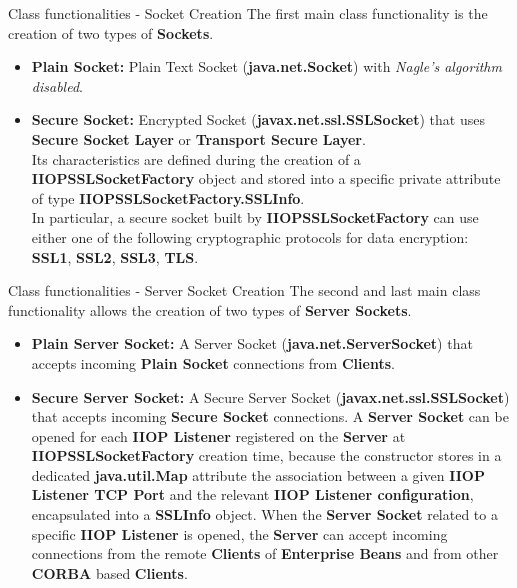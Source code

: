 \documentclass{../common/latex_classes/pdf_presentation}
\begin{document}
		\begin{frame}{Class functionalities - Socket Creation}
			The first main class functionality is the creation of two types of \textbf{Sockets}.
			\begin{itemize}
				\item \textbf{Plain Socket:}
					Plain Text Socket (\textbf{java.net.Socket}) with \textit{Nagle's algorithm disabled}.
				\item \textbf{Secure Socket:}
					Encrypted Socket (\textbf{javax.net.ssl.SSLSocket}) that uses \textbf{Secure Socket Layer} or \textbf{Transport Secure Layer}.\\
					Its characteristics are defined during the creation of a \textbf{IIOPSSLSocketFactory} object and stored into a specific private attribute of type \textbf{IIOPSSLSocketFactory.SSLInfo}.\\
					In particular, a secure socket built by \textbf{IIOPSSLSocketFactory} can use either one of the following cryptographic protocols for data encryption: \textbf{SSL1}, \textbf{SSL2}, \textbf{SSL3}, \textbf{TLS}.
			\end{itemize}
		\end{frame}
		
		\begin{frame}{Class functionalities - Server Socket Creation}
			The second and last main class functionality allows the creation of two types of \textbf{Server Sockets}.
			\begin{itemize}
				\item \textbf{Plain Server Socket:}
					A Server Socket (\textbf{java.net.ServerSocket}) that accepts incoming \textbf{Plain Socket} connections from \textbf{Clients}.
				\item \textbf{Secure Server Socket:}
					A Secure Server Socket (\textbf{javax.net.ssl.SSLSocket}) that accepts incoming \textbf{Secure Socket} connections.
					A \textbf{Server Socket} can be opened for each \textbf{IIOP Listener} registered on the \textbf{Server} at \textbf{IIOPSSLSocketFactory} creation time, because the constructor stores in a dedicated \textbf{java.util.Map} attribute the association between a given \textbf{IIOP Listener TCP Port} and the relevant \textbf{IIOP Listener configuration}, encapsulated into a \textbf{SSLInfo} object.
					When the \textbf{Server Socket} related to a specific \textbf{IIOP Listener} is opened, the \textbf{Server} can accept incoming connections from the remote \textbf{Clients} of \textbf{Enterprise Beans} and from other \textbf{CORBA} based \textbf{Clients}.
			\end{itemize}
		\end{frame}
		
\end{document}
